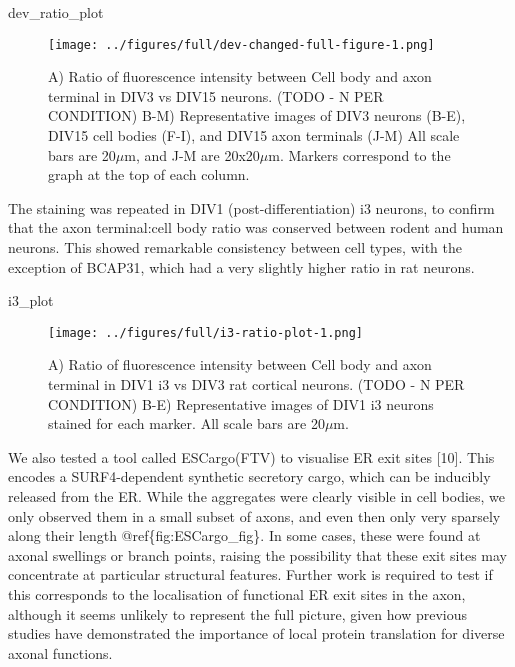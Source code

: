 \documentclass[
  12pt,
  a4paper,
]{article}
\newenvironment{Shaded}{\begin{snugshade}}{\end{snugshade}}
\newcommand{\NormalTok}[1]{#1}
\begin{document}
\begin{Shaded}
\begin{Highlighting}[]
\NormalTok{dev\_ratio\_plot}
\end{Highlighting}
\end{Shaded}

\begin{figure}
\centering
\texttt{[image: ../figures/full/dev-changed-full-figure-1.png]}
\caption{A) Ratio of fluorescence intensity between Cell body and axon
terminal in DIV3 vs DIV15 neurons. (TODO - N PER CONDITION) B-M)
Representative images of DIV3 neurons (B-E), DIV15 cell bodies (F-I),
and DIV15 axon terminals (J-M) All scale bars are 20\(\mu\)m, and J-M
are 20x20\(\mu\)m. Markers correspond to the graph at the top of each
column.}
\end{figure}

The staining was repeated in DIV1 (post-differentiation) i3 neurons, to
confirm that the axon terminal:cell body ratio was conserved between
rodent and human neurons. This showed remarkable consistency between
cell types, with the exception of BCAP31, which had a very slightly
higher ratio in rat neurons.

\begin{Shaded}
\begin{Highlighting}[]
\NormalTok{i3\_plot}
\end{Highlighting}
\end{Shaded}

\begin{figure}
\centering
\texttt{[image: ../figures/full/i3-ratio-plot-1.png]}
\caption{A) Ratio of fluorescence intensity between Cell body and axon
terminal in DIV1 i3 vs DIV3 rat cortical neurons. (TODO - N PER
CONDITION) B-E) Representative images of DIV1 i3 neurons stained for
each marker. All scale bars are 20\(\mu\)m.}
\end{figure}

We also tested a tool called ESCargo(FTV) to visualise ER exit sites
{[}10{]}. This encodes a SURF4-dependent synthetic secretory cargo,
which can be inducibly released from the ER. While the aggregates were
clearly visible in cell bodies, we only observed them in a small subset
of axons, and even then only very sparsely along their length
@ref\{fig:ESCargo\_fig\}. In some cases, these were found at axonal
swellings or branch points, raising the possibility that these exit
sites may concentrate at particular structural features. Further work is
required to test if this corresponds to the localisation of functional
ER exit sites in the axon, although it seems unlikely to represent the
full picture, given how previous studies have demonstrated the
importance of local protein translation for diverse axonal functions.
\end{document}
